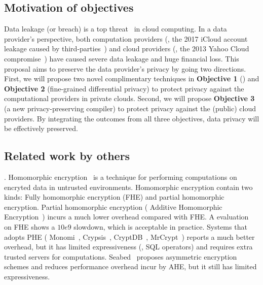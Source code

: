 \vspace{-.15in}\subsection{Motivation of objectives} 
\label{sec:motivation}\vspace{-.075in}


Data leakage (or breach) is a top threat~\cite{top-threats,kazim2015survey} in 
cloud computing. In a data provider's perspective, both computation providers 
(\eg, the 2017 iCloud account leakage caused 
by third-parties~\cite{icloud-breach}) and cloud providers (\eg, the 2013 Yahoo 
Cloud compromise~\cite{yahoo-dropbox-breach}) have caused severe data leakage 
and huge financial loss. This proposal aims to preserve the data provider's 
privacy by going two directions. First, we will propose two novel complimentary 
techniques in \textbf{Objective 1} (\kakute) and \textbf{Objective 2} 
(fine-grained differential privacy) to protect privacy against the computational 
providers in private clouds. Second, we will propose \textbf{Objective 3} (a 
new privacy-preserving compiler) to protect privacy against the (public) cloud 
providers. By integrating the outcomes from all three objectives, data privacy 
will be effectively preserved.


\subsection{Related work by others} 
\label{sec:others-work}\vspace{-.075in}

. Homomorphic 
encryption~\cite{fullmomo:stoc09,paillier,elgamal} is a
technique for performing computations on encryted data in untrusted 
environments. Homomorphic encryption contain two kinds: Fully 
homomorphic encryption (FHE) and partial 
homomorphic encryption.
Partial homomorphic encryption (\eg{} Additive Homomorphic 
Encryption~\cite{paillier})
incurs a much lower overhead compared with FHE. A evaluation~\cite{homo:eval} on
FHE shows a $10e9$ slowdown, which is acceptable in practice.
Systems that adopts PHE (\eg{} Monomi~\cite{monomi:vldb13},
Crypsis~\cite{crypsis:hotcloud14}, CryptDB~\cite{cryptdb:sosp11},
MrCrypt~\cite{mrcrypt:oospsla14})
reports a much better overhead, but it has limited expressiveness
(\eg, SQL operators) and requires extra trusted servers for computations.
Seabed~\cite{seabed:osdi16} proposes asymmetric encryption schemes and reduces 
performance overhead incur by AHE, but it still has limited expressiveness.

